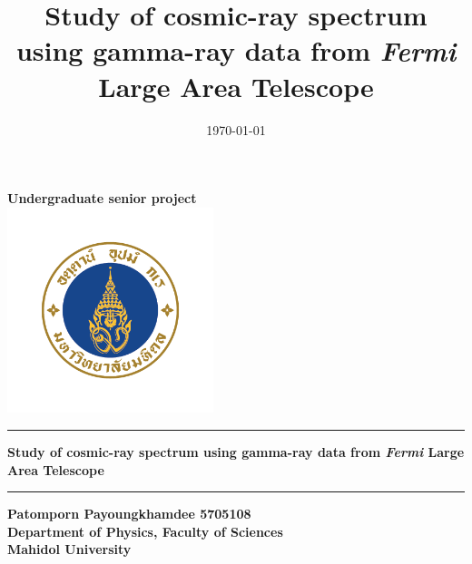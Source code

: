 \documentclass[a4paper, 11pt, oneside]{Thesis}  %
\begin{document}
\frontmatter      %


\begin{titlepage}
    \centering
    \vfill
    {\bfseries\LARGE
    	\vskip1cm
        Undergraduate senior project \\
        \vskip1cm
    }    
    \includegraphics[width=6cm]{img/mahidol} %
    \noindent\rule{\textwidth}{1.0pt}
    {\bfseries\huge
    	\vskip0.2cm
        Study of cosmic-ray spectrum using gamma-ray data from \textit{Fermi} Large Area Telescope
        \vskip0.2cm
    }    
    \noindent\rule{\textwidth}{1.0pt}
    {\bfseries\LARGE
    	\vskip1cm
        Patomporn Payoungkhamdee 5705108 \\
        \vskip0.4cm
        Department of Physics, Faculty of Sciences \\
        \vskip0.2cm
        Mahidol University
    }    
    \vfill
    \vfill
\end{titlepage}


\title  {Study of cosmic-ray spectrum using gamma-ray data from \textit{Fermi} Large Area Telescope}
\addresses  {\groupname\\\deptname\\\univname}  %
\date       {\today}
\subject    {}
\keywords   {}

\end{document}
